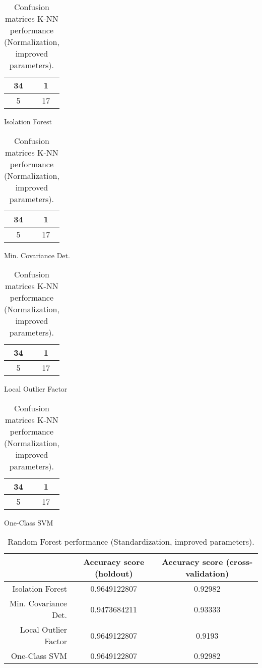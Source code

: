 \documentclass{article}
\begin{document}
\begin{table}[h]
\begin{subtable}[h]{0.2\textwidth}
\centering
\begin{tabular}{c|c}
34 & 1 \\
\hline
5 & 17 \\
\end{tabular}
\caption{Isolation Forest}
\end{subtable}
\hfill
\begin{subtable}[h]{0.2\textwidth}
\centering
\begin{tabular}{c|c}
34 & 1 \\
\hline
5 & 17 \\
\end{tabular}
\caption{Min. Covariance Det.}
\end{subtable}
\hfill
\begin{subtable}[h]{0.2\textwidth}
\centering
\begin{tabular}{c|c}
34 & 1 \\
\hline
5 & 17 \\
\end{tabular}
\caption{Local Outlier Factor}
\end{subtable}
\hfill
\begin{subtable}[h]{0.2\textwidth}
\centering
\begin{tabular}{c|c}
34 & 1 \\
\hline
5 & 17 \\
\end{tabular}
\caption{One-Class SVM}
\end{subtable}
\caption{Confusion matrices K-NN performance (Normalization, improved parameters).}
\end{table}

\begin{table}[h]
\begin{center}
\begin{tabular}{r|c|c}
& Accuracy score (holdout) & Accuracy score (cross-validation) \\
\hline
Isolation Forest &	0.9649122807	&0.92982\\
Min. Covariance Det.	&0.9473684211&	0.93333\\
Local Outlier Factor&	0.9649122807	&0.9193\\
One-Class SVM&	0.9649122807&	0.92982\\
\end{tabular}
\caption{Random Forest performance (Standardization, improved parameters).}
\end{center}
\end{table}
\end{document}
